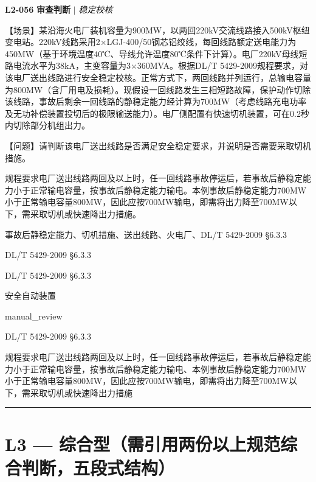 \documentclass[11pt,a4paper]{ctexart}
\begin{document}
\noindent\textbf{L2-056} \hfill \textbf{审查判断} $|$ \textit{稳定校核}
\begin{description}[leftmargin=1.5em,style=nextline,font=\normalfont]
  \item[Q:] 【场景】某沿海火电厂装机容量为900MW，以两回220kV交流线路接入500kV枢纽变电站。220kV线路采用2×LGJ-400/50钢芯铝绞线，每回线路额定送电能力为450MW（基于环境温度40℃、导线允许温度80℃条件下计算）。电厂220kV母线短路电流水平为38kA，主变容量为3×360MVA。根据DL/T 5429-2009规程要求，对该电厂送出线路进行安全稳定校核。正常方式下，两回线路并列运行，总输电容量为800MW（含厂用电及损耗）。现假设一回线路发生三相短路故障，保护动作切除该线路，事故后剩余一回线路的静稳定能力经计算为700MW（考虑线路充电功率及无功补偿装置投切后的极限输送能力）。电厂侧配置有快速切机装置，可在0.2秒内切除部分机组出力。

【问题】请判断该电厂送出线路是否满足安全稳定要求，并说明是否需要采取切机措施。
  \item[A:] 规程要求电厂送出线路两回及以上时，任一回线路事故停运后，若事故后静稳定能力小于正常输电容量，按事故后静稳定能力输电。本例事故后静稳定能力700MW小于正常输电容量800MW，因此应按700MW输电，即需将出力降至700MW以下，需采取切机或快速降出力措施。
  \item[KW:] 事故后静稳定能力、切机措施、送出线路、火电厂、DL/T 5429-2009 §6.3.3
  \item[标准:] DL/T 5429-2009 §6.3.3
  \item[条款溯源:] DL/T 5429-2009 §6.3.3
  \item[主题:] 安全自动装置
  \item[评分方式:] manual\_review
  \item[Rubric条款:] DL/T 5429-2009 §6.3.3
  \item[Rubric判据:] 规程要求电厂送出线路两回及以上时，任一回线路事故停运后，若事故后静稳定能力小于正常输电容量，按事故后静稳定能力输电、本例事故后静稳定能力700MW小于正常输电容量800MW，因此应按700MW输电，即需将出力降至700MW以下，需采取切机或快速降出力措施

\end{description}
\vspace{4pt}
\hrule
\vspace{6pt}

\section*{L3 — 综合型（需引用两份以上规范综合判断，五段式结构）}
\end{document}
